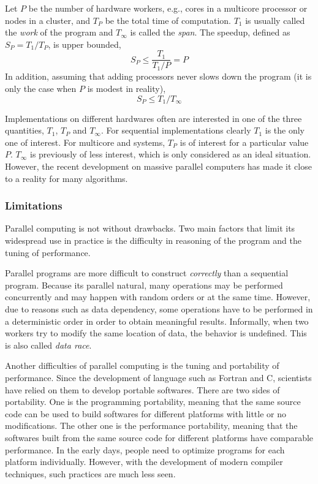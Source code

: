 Let $P$ be the number of hardware workers, e.g., cores in a multicore
processor or nodes in a cluster, and $T_P$ be the total time of computation.
$T_1$ is usually called the \emph{work} of the program and $T_{\infty}$ is
called the \emph{span}. The speedup, defined as $S_P = T_1/T_P$, is upper
bounded,
\begin{equation}
  S_P \le \frac{T_1}{T_1/P} = P
\end{equation}
In addition, assuming that adding processors never slows down the program (it
is only the case when $P$ is modest in reality),
\begin{equation}
  S_P \le T_1/T_{\infty}
\end{equation}

Implementations on different hardwares often are interested in one of the
three quantities, $T_1$, $T_P$ and $T_{\infty}$. For sequential
implementations clearly $T_1$ is the only one of interest. For multicore and
\smp systems, $T_P$ is of interest for a particular value $P$. $T_{\infty}$ is
previously of less interest, which is only considered as an ideal situation.
However, the recent development on massive parallel computers has made it
close to a reality for many algorithms.

\subsubsection{Limitations}
\label{ssub:Limitations}

Parallel computing is not without drawbacks. Two main factors that limit its
widespread use in practice is the difficulty in reasoning of the program and
the tuning of performance.

Parallel programs are more difficult to construct \emph{correctly} than a
sequential program. Because its parallel natural, many operations may be
performed concurrently and may happen with random orders or at the same time.
However, due to reasons such as data dependency, some operations have to be
performed in a deterministic order in order to obtain meaningful results.
Informally, when two workers try to modify the same location of data, the
behavior is undefined. This is also called \emph{data race}.

Another difficulties of parallel computing is the tuning and portability of
performance. Since the development of language such as Fortran and C,
scientists have relied on them to develop portable softwares. There are two
sides of portability. One is the programming portability, meaning that the
same source code can be used to build softwares for different platforms with
little or no modifications. The other one is the performance portability,
meaning that the softwares built from the same source code for different
platforms have comparable performance. In the early days, people need to
optimize programs for each platform individually. However, with the
development of modern compiler techniques, such practices are much less seen.

